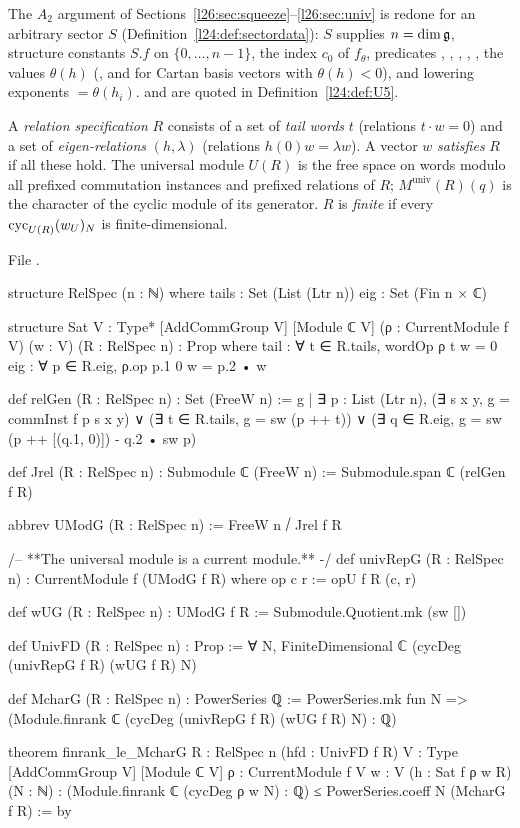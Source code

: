 The $A_2$ argument of Sections~\ref{l26:sec:squeeze}--\ref{l26:sec:univ} is redone for an arbitrary sector
$S$ (Definition~\ref{l24:def:sectordata}): $S$ supplies $n=\dim\mathfrak g$, structure constants $S.f$ on $\{0,\dots,n-1\}$,
the index $c_0$ of $f_\theta$, predicates , , , , ,
the values $\theta(h)$ (, and  for Cartan basis vectors with $\theta(h)<0$), and lowering exponents
$=\theta(h_i)$.  and  are quoted in
Definition~\ref{l24:def:U5}.

\begin{definition}\label{l26:def:relspec}
A \emph{relation specification} $R$ consists of a set of \emph{tail words} $t$ (relations $t\cdot w=0$) and a set of
\emph{eigen-relations} $(h,\lambda)$ (relations $h(0)w=\lambda w$). A vector $w$ \emph{satisfies} $R$ if all these hold. The
universal module $U(R)$ is the free space on words modulo all prefixed commutation instances and prefixed relations of $R$;
$M^{\mathrm{univ}}(R)(q)$ is the character of the cyclic module of its generator. $R$ is \emph{finite} if every
$\operatorname{cyc}_{U(R)}(w_U)_N$ is finite-dimensional.
\end{definition}
\noindent File .
\begin{leancode}
structure RelSpec (n : ℕ) where
  tails : Set (List (Ltr n))
  eig : Set (Fin n × ℂ)

structure Sat {V : Type*} [AddCommGroup V] [Module ℂ V] (ρ : CurrentModule f V) (w : V)
    (R : RelSpec n) : Prop where
  tail : ∀ t ∈ R.tails, wordOp ρ t w = 0
  eig : ∀ p ∈ R.eig, ρ.op p.1 0 w = p.2 • w

def relGen (R : RelSpec n) : Set (FreeW n) :=
  {g | ∃ p : List (Ltr n), (∃ s x y, g = commInst f p s x y) ∨ (∃ t ∈ R.tails, g = sw (p ++ t)) ∨
    (∃ q ∈ R.eig, g = sw (p ++ [(q.1, 0)]) - q.2 • sw p)}

def Jrel (R : RelSpec n) : Submodule ℂ (FreeW n) := Submodule.span ℂ (relGen f R)

abbrev UModG (R : RelSpec n) := FreeW n ⧸ Jrel f R

/-- **The universal module is a current module.** -/
def univRepG (R : RelSpec n) : CurrentModule f (UModG f R) where
  op c r := opU f R (c, r)

def wUG (R : RelSpec n) : UModG f R := Submodule.Quotient.mk (sw [])

def UnivFD (R : RelSpec n) : Prop :=
  ∀ N, FiniteDimensional ℂ (cycDeg (univRepG f R) (wUG f R) N)

def McharG (R : RelSpec n) : PowerSeries ℚ :=
  PowerSeries.mk fun N => (Module.finrank ℂ (cycDeg (univRepG f R) (wUG f R) N) : ℚ)

theorem finrank_le_McharG {R : RelSpec n} (hfd : UnivFD f R) {V : Type} [AddCommGroup V]
    [Module ℂ V] {ρ : CurrentModule f V} {w : V} (h : Sat f ρ w R) (N : ℕ) :
    (Module.finrank ℂ (cycDeg ρ w N) : ℚ) ≤ PowerSeries.coeff N (McharG f R) := by
\end{leancode}


